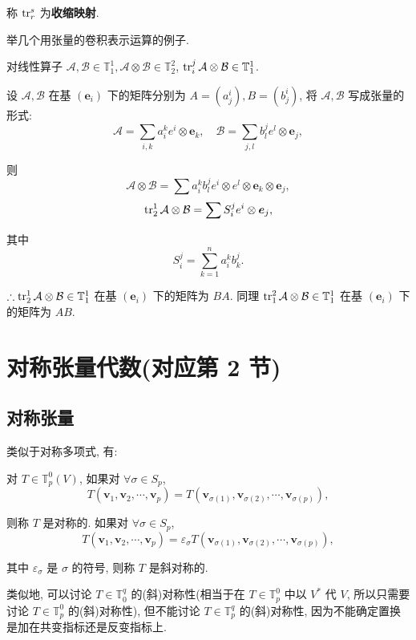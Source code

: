 \documentclass{ctexart}
\begin{document}
称 $\operatorname{tr} _r^s$ 为\textbf{收缩映射}.

举几个用张量的卷积表示运算的例子.
\begin{example}
    对线性算子 $\mathcal{A},\mathcal{B}\in\mathbb{T}_1^1,\mathcal{A}\otimes\mathcal{B}\in\mathbb{T}_2^2$, $\operatorname{tr} _i^j\mathcal{A}\otimes\mathcal{B}\in\mathbb{T}_1^1$.

    设 $\mathcal{A},\mathcal{B}$ 在基 $(\boldsymbol{e}_i)$ 下的矩阵分别为 $A=(a_j^i),B=(b_j^i)$, 将 $\mathcal{A},\mathcal{B}$ 写成张量的形式:
    \[\mathcal{A}=\sum\limits_{i,k}a_i^ke^i\otimes\boldsymbol{e}_k,\quad\mathcal{B}=\sum\limits_{j,l}b_l^je^l\otimes\boldsymbol{e}_j,\]

    则
    \[\mathcal{A}\otimes\mathcal{B}=\sum a_i^kb_l^je^i\otimes e^l\otimes\boldsymbol{e}_k\otimes\boldsymbol{e}_j,\]
    \[\operatorname{tr} _2^1\mathcal{A}\otimes\mathcal{B}=\sum S_i^je^i\otimes\boldsymbol{e}_j,\]

    其中
    \[S_i^j=\sum\limits_{k=1}^na_i^kb_k^j.\]

    $\therefore\operatorname{tr} _2^1\mathcal{A}\otimes\mathcal{B}\in\mathbb{T}_1^1$ 在基 $(\boldsymbol{e}_i)$ 下的矩阵为 $BA$. 同理 $\operatorname{tr} _1^2\mathcal{A}\otimes\mathcal{B}\in\mathbb{T}_1^1$ 在基 $(\boldsymbol{e}_i)$ 下的矩阵为 $AB$.
\end{example}
\section{对称张量代数(对应第 2 节)}
\subsection{对称张量}
类似于对称多项式, 有:
\begin{definition}
    对 $T\in\mathbb{T}_p^0(V)$, 如果对 $\forall\sigma\in S_p$,
    \[T(\boldsymbol{v}_1,\boldsymbol{v}_2,\cdots,\boldsymbol{v}_p)=T(\boldsymbol{v}_{\sigma(1)},\boldsymbol{v}_{\sigma(2)},\cdots,\boldsymbol{v}_{\sigma(p)}),\]

    则称 $T$ 是对称的. 如果对 $\forall\sigma\in S_p$,
    \[T(\boldsymbol{v}_1,\boldsymbol{v}_2,\cdots,\boldsymbol{v}_p)=\varepsilon_\sigma T(\boldsymbol{v}_{\sigma(1)},\boldsymbol{v}_{\sigma(2)},\cdots,\boldsymbol{v}_{\sigma(p)}),\]

    其中 $\varepsilon_\sigma$ 是 $\sigma$ 的符号, 则称 $T$ 是斜对称的.
\end{definition}

类似地, 可以讨论 $T\in\mathbb{T}^q_0$ 的(斜)对称性(相当于在 $T\in\mathbb{T}_p^0$ 中以 $V^*$ 代 $V$, 所以只需要讨论 $T\in\mathbb{T}^0_p$ 的(斜)对称性), 但不能讨论 $T\in\mathbb{T}^q_p$ 的(斜)对称性, 因为不能确定置换是加在共变指标还是反变指标上.
\end{document}
